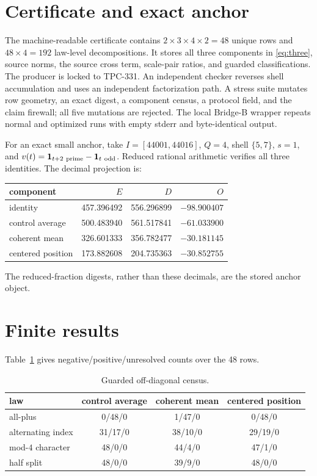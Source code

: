 \documentclass[10pt]{article}
\newcommand{\ind}{\mathbf 1}
\begin{document}
\section{Certificate and exact anchor}
The machine-readable certificate contains $2\times3\times4\times2=48$
unique rows and $48\times4=192$ law-level decompositions.  It stores all
three components in \eqref{eq:three}, source norms, the source cross term,
scale-pair ratios, and guarded classifications.  The producer is locked to
TPC-331.  An independent checker reverses shell accumulation and uses an
independent factorization path.  A stress suite mutates row geometry, an
exact digest, a component census, a protocol field, and the claim firewall;
all five mutations are rejected.  The local Bridge-B wrapper repeats normal
and optimized runs with empty stderr and byte-identical output.

For an exact small anchor, take $I=[44001,44016]$, $Q=4$, shell $\{5,7\}$,
$s=1$, and $v(t)=\ind_{t+2\ {\rm prime}}-\ind_{t\ {\rm odd}}$.
Reduced rational arithmetic verifies all three identities.  The decimal
projection is:
\begin{center}\small
\begin{tabular}{lrrr}
\toprule
component & $E$ & $D$ & $O$\\
\midrule
identity & 457.396492 & 556.296899 & $-98.900407$\\
control average & 500.483940 & 561.517841 & $-61.033900$\\
coherent mean & 326.601333 & 356.782477 & $-30.181145$\\
centered position & 173.882608 & 204.735363 & $-30.852755$\\
\bottomrule
\end{tabular}\end{center}
The reduced-fraction digests, rather than these decimals, are the stored
anchor object.

\section{Finite results}
Table~\ref{tab:census} gives negative/positive/unresolved counts over the 48
rows.
\begin{table}[ht]
\centering\small
\caption{Guarded off-diagonal census.}\label{tab:census}
\begin{tabular}{lccc}
\toprule
law & control average & coherent mean & centered position\\
\midrule
all-plus & 0/48/0 & 1/47/0 & 0/48/0\\
alternating index & 31/17/0 & 38/10/0 & 29/19/0\\
mod-$4$ character & 48/0/0 & 44/4/0 & 47/1/0\\
half split & 48/0/0 & 39/9/0 & 48/0/0\\
\bottomrule
\end{tabular}
\end{table}
\end{document}
